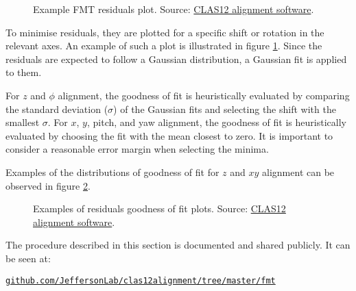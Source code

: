     \begin{figure}[b!]
        \centering{}
        \caption[Example FMT residuals plot]{Example FMT residuals plot.
        Source: \hyperlink{github.com/JeffersonLab/clas12alignment}{CLAS12 alignment software}.}
        \label{fig::12.20::fmt_residuals_example}
    \end{figure}

    To minimise residuals, they are plotted for a specific shift or rotation in the relevant axes.
    An example of such a plot is illustrated in figure \ref{fig::12.20::fmt_residuals_example}.
    Since the residuals are expected to follow a Gaussian distribution, a Gaussian fit is applied to them.

    For $z$ and $\phi$ alignment, the goodness of fit is heuristically evaluated by comparing the standard deviation ($\sigma$) of the Gaussian fits and selecting the shift with the smallest $\sigma$.
    For $x$, $y$, pitch, and yaw alignment, the goodness of fit is heuristically evaluated by choosing the fit with the mean closest to zero.
    It is important to consider a reasonable error margin when selecting the minima.

    Examples of the distributions of goodness of fit for $z$ and $xy$ alignment can be observed in figure \ref{fig::12.20::fmt_residuals_fit_example}.

    \begin{figure}[t!]
        \centering{}
        \caption[Examples of residuals goodness of fit plots]{Examples of residuals goodness of fit plots.
        Source: \hyperlink{github.com/JeffersonLab/clas12alignment}{CLAS12 alignment software}.}
        \label{fig::12.20::fmt_residuals_fit_example}
    \end{figure}

    
    

    The procedure described in this section is documented and shared publicly.
    It can be seen at:

    \href{github.com/JeffersonLab/clas12alignment/tree/master/fmt}{\texttt{github.com/JeffersonLab/clas12alignment/tree/master/fmt}}
